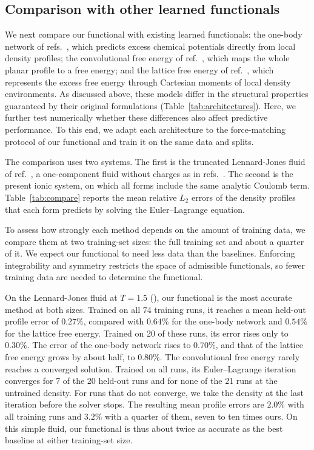 \subsection*{Comparison with other learned functionals}
We next compare our functional with existing learned functionals: the one-body network of refs.~\cite{sammuller2023neural,bui2025learning}, which predicts excess chemical potentials directly from local density profiles; the convolutional free energy of ref.~\cite{dijkman2025learning}, which maps the whole planar profile to a free energy; and the lattice free energy of ref.~\cite{cheng2026equivariant}, which represents the excess free energy through Cartesian moments of local density environments. 
As discussed above, these models differ in the structural properties guaranteed by their original formulations (Table~\ref{tab:architectures}). Here, we further test numerically whether these differences also affect predictive performance. To this end, we adapt each architecture to the force-matching protocol of our functional and train it on the same data and splits.
 
The comparison uses two systems. The first is the truncated Lennard-Jones fluid of ref.~\cite{cheng2026equivariant}, a one-component fluid without charges as in refs.~\cite{sammuller2023neural,dijkman2025learning,cheng2026equivariant}. The second is the present ionic system, on which all forms include the same analytic Coulomb term. Table~\ref{tab:compare} reports the mean relative $L_2$ errors of the density profiles that each form predicts by solving the Euler--Lagrange equation.

To assess how strongly each method depends on the amount of training data, we compare them at two training-set sizes: the full training set and about a quarter of it. We expect our functional to need less data than the baselines. Enforcing integrability and symmetry restricts the space of admissible functionals, so fewer training data are needed to determine the functional.

On the Lennard-Jones fluid at $T=1.5$ (\methodsref), our functional is the most accurate method at both sizes. Trained on all 74 training runs, it reaches a mean held-out profile error of $0.27\%$, compared with $0.64\%$ for the one-body network and $0.54\%$ for the lattice free energy. Trained on 20 of these runs, its error rises only to $0.30\%$. The error of the one-body network rises to $0.70\%$, and that of the lattice free energy grows by about half, to $0.80\%$. The convolutional free energy rarely reaches a converged solution. Trained on all runs, its Euler--Lagrange iteration converges for 7 of the 20 held-out runs and for none of the 21 runs at the untrained density. For runs that do not converge, we take the density at the last iteration before the solver stops. The resulting mean profile errors are $2.0\%$ with all training runs and $3.2\%$ with a quarter of them, seven to ten times ours. On this simple fluid, our functional is thus about twice as accurate as the best baseline at either training-set size.


